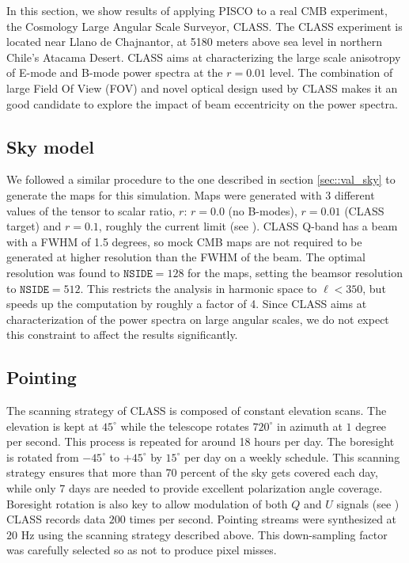 \documentclass[a4paper,fleqn]{cas-dc}\sloppy
\begin{document}
In this section, we show results of applying PISCO to a real CMB experiment, the Cosmology Large Angular Scale Surveyor, CLASS. The CLASS experiment is located near Llano de Chajnantor, at 5180 meters above sea level in northern Chile's Atacama Desert. CLASS aims at characterizing the large scale anisotropy of E-mode and B-mode power spectra at the $r=0.01$ level. The combination of large Field Of View (FOV) and novel optical design used by CLASS makes it an good candidate to explore the impact of beam eccentricity on the power spectra. 

\subsection{Sky model}

We followed a similar procedure to the one described in section \ref{sec::val_sky} to generate the maps for this simulation. Maps were generated with 3 different values of the tensor to scalar ratio, $r$: $r=0.0$ (no B-modes), $r=0.01$ (CLASS target) and $r=0.1$, roughly the current limit (see \cite{2018PhRvL.121v1301B}). CLASS Q-band has a beam with a FWHM of 1.5 degrees, so mock CMB maps are not required to be generated at higher resolution than the FWHM of the beam. The optimal resolution was found to $\mathrm{\texttt{NSIDE}} = 128$ for the maps, setting the beamsor resolution to $\mathrm{\texttt{NSIDE}} = 512$. This restricts the analysis in harmonic space to $\ell < 350$, but speeds up the computation by roughly a factor of 4. Since CLASS aims at characterization of the power spectra on large angular scales, we do not expect this constraint to affect the results significantly.

\subsection{Pointing}

The scanning strategy of CLASS is composed of constant elevation scans. The elevation is kept at $45^{\circ}$ while the telescope rotates $720^\circ$ in azimuth at $1$ degree per second. This process is repeated for around 18 hours per day. The boresight is rotated from $-45^{\circ}$ to $+45^{\circ}$ by $15^{\circ}$ per day on a weekly schedule. This scanning strategy ensures that more than 70 percent of the sky gets covered each day, while only 7 days are needed to provide excellent polarization angle coverage. Boresight rotation is also key to allow modulation of both $Q$ and $U$ signals (see \cite{2016SPIE.9914E..1KH}) CLASS records data $200$ times per second. Pointing streams were synthesized at $20$ Hz using the scanning strategy described above. This down-sampling factor was carefully selected so as not to produce pixel misses. 
\end{document}
